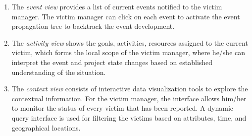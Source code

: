 \begin{enumerate}
	\item The \emph{event view} provides a list of current events notified to the victim manager. The victim manager can click on each event to activate the event propagation tree to backtrack the event development.
	\item The \emph{activity view} shows the goals, activities, resources assigned to the current victim, which forms the local scope of the victim manager, where he/she can interpret the event and project state changes based on established understanding of the situation.
	\item The \emph{context view} consists of interactive data visualization tools to explore the contextual information. For the victim manager, the interface allows him/her to monitor the status of every victim that has been reported. A dynamic query interface is used for filtering the victims based on attributes, time, and geographical locations.
\end{enumerate}





 

